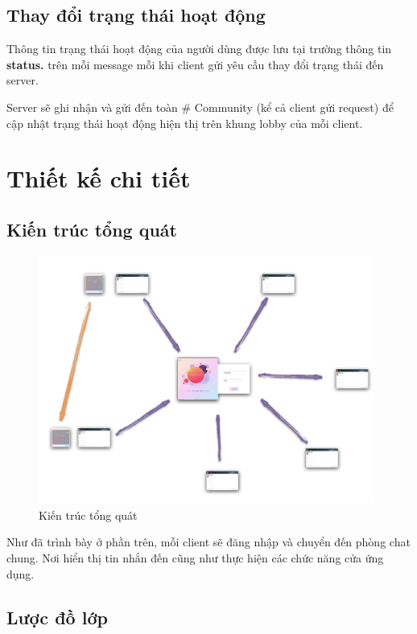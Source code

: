 \documentclass[a4paper]{article}
\begin{document}
\subsection{Thay đổi trạng thái hoạt động}
Thông tin trạng thái hoạt động của người dùng được lưu tại trường thông tin {\bf status.} trên mỗi message mỗi khi client gửi yêu cầu thay đổi trạng thái đến server.

Server sẽ ghi nhận và gửi đến toàn \# Community (kể cả client gửi request) để cập nhật trạng thái hoạt động hiện thị trên khung lobby của mỗi client.

	
\section{Thiết kế chi tiết}
\subsection{Kiến trúc tổng quát}

\begin{figure}[h!]
	\centering
	\includegraphics[width=11cm]{architecture}
	\caption{Kiến trúc tổng quát}
\end{figure}

Như đã trình bày ở phần trên, mỗi client sẽ đăng nhập và chuyển đến phòng chat chung. Nơi hiển thị tin nhắn đến cũng như thực hiện các chức năng cửa ứng dụng.

\newpage
\subsection{Lược đồ lớp}
\end{document}
